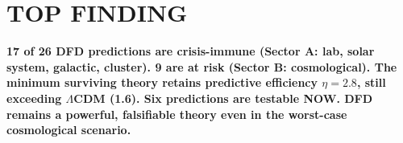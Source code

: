 \documentclass[11pt]{article}
\begin{document}
\section*{TOP FINDING}

\begin{tcolorbox}[colback=blue!5!white, colframe=blue!70!black]
\textbf{17 of 26 DFD predictions are crisis-immune (Sector A: lab, solar
system, galactic, cluster). 9 are at risk (Sector B: cosmological).
The minimum surviving theory retains predictive efficiency $\eta = 2.8$,
still exceeding $\Lambda$CDM (1.6). Six predictions are testable NOW.
DFD remains a powerful, falsifiable theory even in the worst-case
cosmological scenario.}
\end{tcolorbox}
\end{document}
